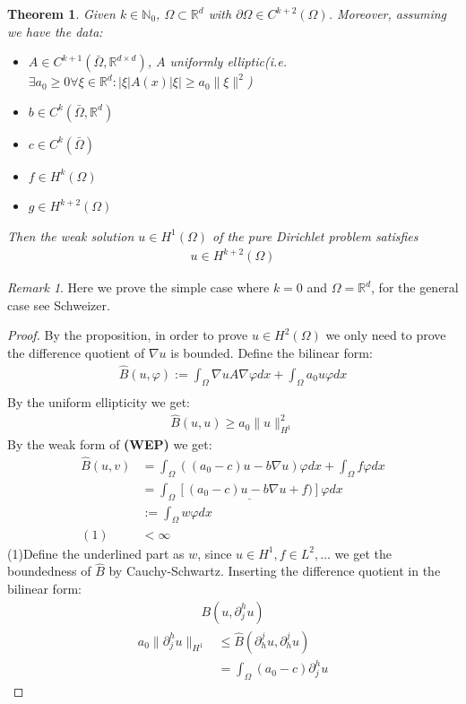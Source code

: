 \documentclass[a4paper,11pt,oneside,fleqn]{book}
\newtheorem{theorem}{Theorem}[section]
\theoremstyle{definition}
\theoremstyle{remark}
\newtheorem*{remark}{Remark}
\begin{document}
\begin{theorem}
 	Given $k \in \mathbb{N}_0$, $\Omega \subset \mathbb{R}^d$ with $\partial \Omega \in C^{k+2}(\Omega)$. Moreover, assuming we have the data:
 	\begin{itemize}
 		\item $A \in C^{k+1}(\bar{\Omega}, \mathbb{R}^{d \times d})$, $A$ uniformly elliptic(i.e. $\exists a_0 \geq 0 \forall \xi \in \mathbb{R}^d: |\xi| A(x) |\xi| \geq a_0 \|\xi\|^2$)
 		\item $b \in C^k(\bar{\Omega}, \mathbb{R}^d)$
 		\item $c \in C^k(\bar{\Omega})$
 		\item $f \in H^k(\Omega)$
 		\item $g \in H^{k+2}(\Omega)$
 	\end{itemize}
 	Then the weak solution $u \in H^1(\Omega)$ of the pure Dirichlet problem satisfies 
 	\begin{align*}
 		u \in H^{k+2}(\Omega)
 	\end{align*}
 \end{theorem}
\begin{remark}
Here we prove the simple case where $k = 0$ and $\Omega = \mathbb{R}^d$, for the general case see Schweizer.
\begin{proof}
 	By the proposition, in order to prove $u \in H^2(\Omega)$ we only need to prove the difference quotient of $\nabla u$ is bounded.
 	Define the bilinear form:
 	\begin{align*}
 		\hat{B}(u, \varphi) := \int_\Omega \nabla u A \nabla \varphi dx + \int_\Omega a_0 u \varphi dx\\
 	\end{align*}
 	By the uniform ellipticity we get:
 	\begin{align*}
 		\hat{B}(u, u) \geq a_0\|u\|_{H^1}^2
 	\end{align*}
	By the weak form of \textbf{(WEP)} we get:
 	\begin{align*}
 		\hat{B}(u, v) &= \int_\Omega ((a_0 - c)u - b\nabla u)\varphi dx     + \int_\Omega f \varphi dx\\
 		&= \int_\Omega \underline{ [(a_0 -c)u - b\nabla u + f)]}\varphi dx\\
 		&:= \int_\Omega w \varphi dx\\
 		(1)&< \infty
 	\end{align*}
 	(1)Define the underlined part as $w$, since $u \in H^1, f \in L^2, \dots$ we get the  boundedness of $\hat{B}$ by Cauchy-Schwartz.
 	Inserting the difference quotient in the bilinear form:
 \begin{align*}
 	B(u, \partial_j^h u)
 \end{align*}
\begin{align*}
	a_0\|\partial^h_j u \|_{H^1} &\leq \hat{B}(\partial_h^j u, \partial_h^j u)\\
	&= \int_\Omega (a_0 - c) \partial^h_j u 
\end{align*}
\end{proof}	
\end{remark}
\end{document}
